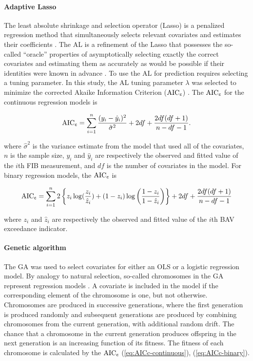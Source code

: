\documentclass[authoryear,review, 12pt]{elsarticle}
\begin{document}
\paragraph{Adaptive Lasso}\label{adaptive-lasso}

The least absolute shrinkage and selection operator (Lasso) is a
penalized regression method that simultaneously selects relevant
covariates and estimates their coefficients \citep{Tibshirani-1996}. The
AL is a refinement of the Lasso that possesses the so-called ``oracle''
properties of asymptotically selecting exactly the correct covariates
and estimating them as accurately as would be possible if their
identities were known in advance \citep{Zou-2006}. To use the AL for
prediction requires selecting a tuning parameter. In this study, the AL
tuning parameter \(\lambda\) was selected to minimize the corrected
Akaike Information Criterion (\(\text{AIC}_{\tt c}\)) \citep{Akaike-1973,Hurvich-Simonoff-Tsai-1998}. The \(\text{AIC}_{\tt c}\) for the
continuous regression models is

\begin{align}\label{eq:AICc-continuous}
\text{AIC}_{\tt c} = \sum_{i=1}^n \frac{(y_i - \hat{y}_i)^2}{\hat{\sigma}^2} + 2df + \frac{2df(df+1)}{n-df-1}.
\end{align}

where \(\hat{\sigma}^2\) is the variance estimate from the model that
used all of the covariates, \(n\) is the sample size, \(y_i\) and
\(\hat{y}_i\) are respectively the observed and fitted value of the
\(i\)th FIB measurement, and \(df\) is the number of covariates in the
model. For binary regression models, the \(\text{AIC}_{\tt c}\) is

\begin{align}\label{eq:AICc-binary}
\text{AIC}_{\tt c} = \sum_{i=1}^n  2\left\{ z_i \log (\frac{z_i}{\hat{z}_i}) + (1-z_i) \log \left( \frac{1-z_i}{1-\hat{z}_i} \right) \right\} + 2df + \frac{2df(df+1)}{n-df-1}
\end{align}

where \(z_i\) and \(\hat{z}_i\) are respectively the observed and fitted
value of the \(i\)th BAV exceedance indicator.

\paragraph{Genetic algorithm}\label{genetic-algorithm}

The GA was used to select covariates for either an OLS or a logistic
regression model. By analogy to natural selection, so-called chromosomes
in the GA represent regression models \citep{Fogel-1998}. A covariate is
included in the model if the corresponding element of the chromosome is
one, but not otherwise. Chromosomes are produced in successive
generations, where the first generation is produced randomly and
subsequent generations are produced by combining chromosomes from the
current generation, with additional random drift. The chance that a
chromosome in the current generation produces offspring in the next
generation is an increasing function of its fitness. The fitness of each
chromosome is calculated by the \(\text{AIC}_{\tt c}\)
(\ref{eq:AICc-continuous}), (\ref{eq:AICc-binary}).
\end{document}
